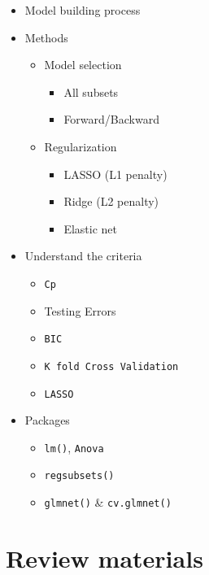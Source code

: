 \documentclass[
]{article}
\providecommand{\tightlist}{%
  \setlength{\itemsep}{0pt}\setlength{\parskip}{0pt}}
\begin{document}
\begin{itemize}
\item
  Model building process
\item
  Methods

  \begin{itemize}
  \tightlist
  \item
    Model selection

    \begin{itemize}
    \tightlist
    \item
      All subsets
    \item
      Forward/Backward
    \end{itemize}
  \item
    Regularization

    \begin{itemize}
    \tightlist
    \item
      LASSO (L1 penalty)
    \item
      Ridge (L2 penalty)
    \item
      Elastic net
    \end{itemize}
  \end{itemize}
\item
  Understand the criteria

  \begin{itemize}
  \tightlist
  \item
    \texttt{Cp}
  \item
    Testing Errors
  \item
    \texttt{BIC}
  \item
    \texttt{K\ fold\ Cross\ Validation}
  \item
    \texttt{LASSO}
  \end{itemize}
\item
  Packages

  \begin{itemize}
  \tightlist
  \item
    \texttt{lm()}, \texttt{Anova}
  \item
    \texttt{regsubsets()}
  \item
    \texttt{glmnet()} \& \texttt{cv.glmnet()}
  \end{itemize}
\end{itemize}

\hypertarget{review-materials}{%
\section{Review materials}\label{review-materials}}
\end{document}
